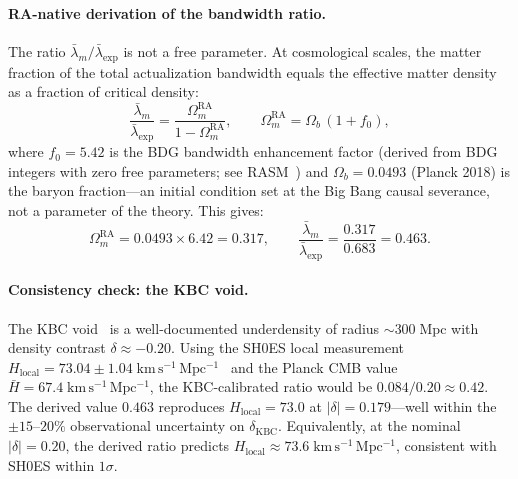 \documentclass[11pt,a4paper]{article}
\theoremstyle{plain}
\theoremstyle{definition}
\theoremstyle{remark}
\begin{document}
\paragraph{RA-native derivation of the bandwidth ratio.}
The ratio $\bar\lambda_m/\bar\lambda_{\mathrm{exp}}$ is not a free parameter.
At cosmological scales, the matter fraction of the total actualization bandwidth
equals the effective matter density as a fraction of critical density:
\begin{equation}
  \frac{\bar\lambda_m}{\bar\lambda_{\mathrm{exp}}}
  = \frac{\Omega_m^{\mathrm{RA}}}{1 - \Omega_m^{\mathrm{RA}}},
  \qquad
  \Omega_m^{\mathrm{RA}} = \Omega_b\,(1 + f_0),
  \label{eq:lambda_ratio_derived}
\end{equation}
where $f_0 = 5.42$ is the BDG bandwidth enhancement factor
(derived from BDG integers with zero free parameters;
see RASM~\citep{Sandeman2026RASM}) and $\Omega_b = 0.0493$
(Planck 2018) is the baryon fraction---an initial condition set at
the Big Bang causal severance, not a parameter of the theory.
This gives:
\begin{equation}
  \Omega_m^{\mathrm{RA}} = 0.0493 \times 6.42 = 0.317,
  \qquad
  \frac{\bar\lambda_m}{\bar\lambda_{\mathrm{exp}}} = \frac{0.317}{0.683} = 0.463.
\end{equation}

\paragraph{Consistency check: the KBC void.}
The KBC void~\citep{Kenworthy2019} is a well-documented underdensity of radius
${\sim}300\;\mathrm{Mpc}$ with density contrast $\delta \approx -0.20$.
Using the SH0ES local measurement $H_{\mathrm{local}} = 73.04 \pm
1.04\;\mathrm{km\,s^{-1}\,Mpc^{-1}}$~\citep{Riess2022} and the Planck CMB
value $\bar H = 67.4\;\mathrm{km\,s^{-1}\,Mpc^{-1}}$, the KBC-calibrated
ratio would be $0.084/0.20 \approx 0.42$.  The derived value $0.463$
reproduces $H_{\mathrm{local}} = 73.0$ at $|\delta| = 0.179$---well within the
${\pm}15$--$20\%$ observational uncertainty on $\delta_{\mathrm{KBC}}$.
Equivalently, at the nominal $|\delta| = 0.20$, the derived ratio predicts
$H_{\mathrm{local}} \approx 73.6\;\mathrm{km\,s^{-1}\,Mpc^{-1}}$,
consistent with SH0ES within $1\sigma$.
\end{document}
